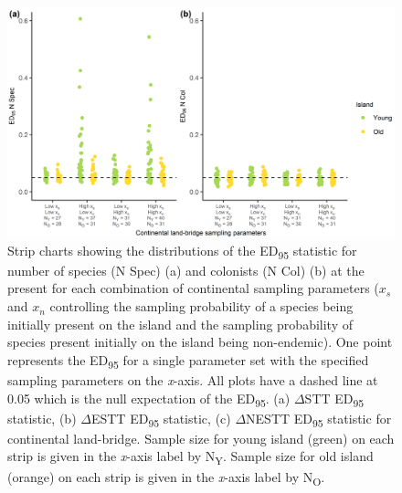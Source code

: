 \begin{figure}
    \centering
    \includegraphics{continental_land_bridge_sample_spec_col_facet_.png}
    \caption{Strip charts showing the distributions of the ED\textsubscript{95} statistic for number of species (N Spec) (a) and colonists (N Col) (b) at the present for each combination of continental sampling parameters ($x_s$ and $x_n$ controlling the sampling probability of a species being initially present on the island and the sampling probability of species present initially on the island being non-endemic). One point represents the ED\textsubscript{95} for a single parameter set with the specified sampling parameters on the \textit{x}-axis. All plots have a dashed line at 0.05 which is the null expectation of the ED\textsubscript{95}. (a) $\Delta$STT ED\textsubscript{95} statistic, (b) $\Delta$ESTT ED\textsubscript{95} statistic, (c) $\Delta$NESTT ED\textsubscript{95} statistic for continental land-bridge. Sample size for young island (green) on each strip is given in the \textit{x}-axis label by N\textsubscript{Y}. Sample size for old island (orange) on each strip is given in the \textit{x}-axis label by N\textsubscript{O}.}
    \label{fig:continental_land_bridge_sample_spec_col_facet_}
\end{figure}

